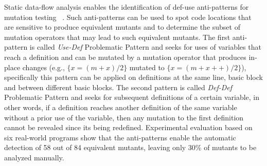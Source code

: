 Static data-flow analysis enables the identification of def-use anti-patterns for mutation testing~ \cite{kintis2014using,kintis2015medic}.
Such anti-patterns can be used to spot code locations that are sensitive to produce equivalent mutants 
and to determine the subset of mutation operators that may lead to such equivalent mutants.
The first anti-pattern is called \textit{Use-Def} Problematic Pattern and seeks for uses of variables that reach a definition and can be mutated by a mutation operator that produces in-place changes (e.g., $\{x = (m + x)/2\}$ mutated to $\{x = (m + x++)/2\}$), specifically this pattern can be applied on definitions at the same line, basic block and between different basic blocks. 
The second pattern is called \textit{Def-Def} Problematic Pattern and seeks for subsequent definitions of a certain variable, in other words, if a definition reaches another definition of the same variable without a prior use of the variable, then any mutation to the first definition cannot be revealed since its being redefined. 
Experimental evaluation based on six real-world programs show that the anti-patterns enable the automatic detection of 58 out of 84 equivalent mutants, leaving only 30\% of mutants to be analyzed manually.

